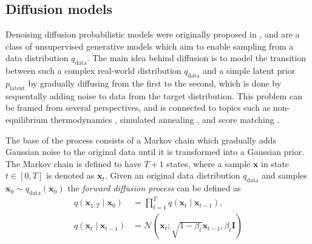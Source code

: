 \documentclass{article}
\begin{document}

\subsection{Diffusion models}
Denoising diffusion probabilistic models were originally proposed in  \cite{Sohl-Dickstein_Weiss_Maheswaranathan_Ganguli_2015}, and are a class of unsupervised generative models which aim to enable sampling from a data distribution $q_{\text{data}}$. The main idea behind diffusion is to model the transition between such a complex real-world distribution $q_{\text{data}}$ and a simple latent prior $p_{\text{latent}}$ by gradually diffusing from the first to the second, which is done by sequentally adding noise to data from the target distribution. This problem can be framed from several perspectives, and is connected to topics such as non-equilibrium thermodynamics \cite{Sohl-Dickstein_Weiss_Maheswaranathan_Ganguli_2015}, simulated annealing \cite{neal2001annealed}, and score matching \cite{song2019generative}.

The base of the process consists of a Markov chain which gradually adds Gaussian noise to the original data until it is transformed into a Gaussian prior. The Markov chain is defined to have $T+1$ states, where a sample $\bm{x}$ in state $t \in [0, T]$ is denoted as $\bm{x}_{t}$. Given an original data distribution $q_{\text{data}}$ and samples $\bm{x}_0 \sim q_{\text{data}}(\bm{x}_0)$ the \textit{forward diffusion process} can be defined as
\begin{align}
    q(\bm{x}_{1:T} \mid \bm{x}_0) &= \prod_{t=1}^T q(\bm{x}_t \mid \bm{x}_{t-1}), \\
    q(\bm{x}_t \mid \bm{x}_{t-1}) &= \mathcal{N}(\bm{x}_t ; \sqrt{1-\beta_t} \bm{x}_{t-1}, \beta_t \textbf{I})
\end{align}
\end{document}
